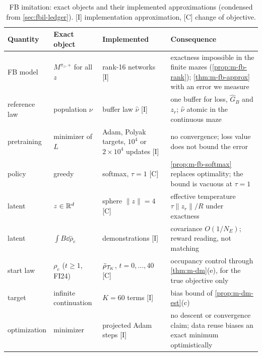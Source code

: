 \begin{table}[ht]
\centering\small
\caption{FB imitation: exact objects and their implemented approximations (condensed from \cref{sec:fbil-ledger}). \textsf{[I]} implementation approximation, \textsf{[C]} change of objective.}\label{tab:fbil-ledger}
\begin{tabularx}{\textwidth}{@{}>{\raggedright\arraybackslash}p{2.4cm}>{\raggedright\arraybackslash}p{3.3cm}>{\raggedright\arraybackslash}p{3.7cm}>{\raggedright\arraybackslash}X@{}}
\toprule
Quantity & Exact object & Implemented & Consequence\\
\midrule
FB model & $M^{\pi_z,+}$ for all $z$ & rank-16 networks \textsf{[I]} & exactness impossible in the finite mazes (\cref{prop:m-fb-rank}); \cref{thm:m-fb-approx} with an error we measure\\
reference law & population $\nu$ & buffer law $\hat\nu$ \textsf{[I]} & one buffer for loss, $\hat G_B$ and $z_r$; $\hat\nu$ atomic in the continuous maze\\
pretraining & minimizer of $L$ & Adam, Polyak targets, $10^4$ or $2\times10^4$ updates \textsf{[I]} & no convergence; loss value does not bound the error\\
policy & greedy & softmax, $\tau=1$ \textsf{[C]} & \cref{prop:m-fb-softmax} replaces optimality; the bound is vacuous at $\tau=1$\\
latent & $z\in\mathbb{R}^d$ & sphere $\lVert z\rVert=4$ \textsf{[C]} & effective temperature $\tau\lVert z_r\rVert/R$ under exactness\\
\ERFB{} latent & $\int B\dd\bar\rho_e$ & 4 demonstrations \textsf{[I]} & covariance $O(1/N_E)$; reward reading, not matching\\
\DMFB{} start law & $\rho_e$ ($t\ge1$, FI24) & $\bar\rho_{\mathcal{T}_K}$, $t=0,\dots,40$ \textsf{[C]} & occupancy control through \cref{thm:m-dm}(e), for the true objective only\\
\DMFB{} target & infinite continuation & $K=60$ terms \textsf{[I]} & bias bound of \cref{prop:m-dm-est}(c)\\
\DMFB{} optimization & minimizer & 300 projected Adam steps \textsf{[I]} & no descent or convergence claim; data reuse biases an exact minimum optimistically\\
\bottomrule
\end{tabularx}
\end{table}
